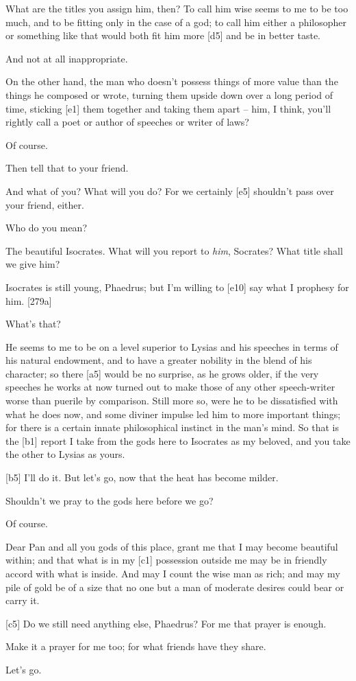  What are the titles you assign him, then?  To call him
wise seems to me to be too much, and to be fitting only in the case of a
god; to call him either a
philosopher or something
like that would both fit him more {[}d5{]} and be in better taste.

 And not at all inappropriate.

 On the other hand, the man who doesn't possess things of more
value than the things he composed or wrote, turning them upside down
over a long period of time, sticking {[}e1{]} them together and taking
them apart -- him, I think, you'll rightly call a poet or author of
speeches or writer of laws?

 Of course.

 Then tell that to your friend.

 And what of you? What will you do? For we certainly {[}e5{]}
shouldn't pass over your friend, either.

 Who do you mean?

 The beautiful
Isocrates. What will you
report to {\em him}, Socrates? What title shall we give him?

 Isocrates is still young, Phaedrus; but I'm willing to
{[}e10{]} say what I prophesy for him. {[}279a{]}

 What's that?

 He seems to me to be on a level superior to Lysias and his
speeches in terms of his natural endowment, and to have a greater
nobility in the blend of his character; so there {[}a5{]} would be no
surprise, as he grows older, if the very speeches he works at now turned
out to make those of any other speech-writer worse than puerile by
comparison. Still more so, were he to be dissatisfied with what he does
now, and some diviner impulse led him to more important things; for
there is a certain innate philosophical instinct in the man's mind. So
that is the {[}b1{]} report I take from the gods here to Isocrates as my
beloved, and you take the other to Lysias as yours.

{[}b5{]}  I'll do it. But let's go, now that the heat has become
milder.

 Shouldn't we pray to the gods here before we go?

 Of course.

 Dear Pan and all you gods of this place, grant me that I may
become beautiful within; and that what is in my {[}c1{]} possession
outside me may be in friendly accord with what is inside. And may I
count the wise man as rich; and may my pile of gold be of a size that no
one but a man of moderate
desires could bear or
carry it.

{[}c5{]} Do we still need anything else, Phaedrus? For me that prayer is
enough.

 Make it a prayer for me too; for what friends have they share.

 Let's go.

\stoptext
